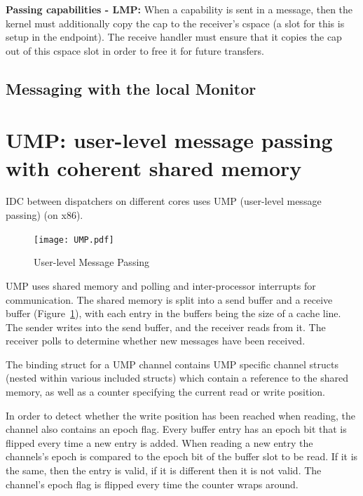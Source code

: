 \documentclass[a4paper,twoside]{report} %
\begin{document}
\textbf{Passing capabilities - LMP:} When a capability is sent in a message, then
the kernel must additionally copy the cap to the receiver's cspace (a slot for
this is setup in the endpoint). The receive handler must ensure that it copies
the cap out of this cspace slot in order to free it for future transfers.



\subsection{Messaging with the local Monitor}
\label{sec:monitor}


\section{UMP: user-level message passing with coherent shared memory}
\label{sec:ump_icd}

IDC between dispatchers on different cores uses UMP (user-level message passing)
(on x86).

\begin{figure}
  \begin{center}
    \texttt{[image: UMP.pdf]}
  \end{center}
  \caption{User-level Message Passing}
  \label{fig:ump}
\end{figure}

UMP uses shared memory and polling and inter-processor interrupts for
communication. The shared memory is split into a send buffer and a receive
buffer (Figure~\ref{fig:ump}), with each entry in the buffers being the size of
a cache line. The sender writes into the send buffer, and the receiver reads
from it. The receiver polls to determine whether new messages have been
received.

The binding struct for a UMP channel contains UMP specific channel structs
(nested within various included structs) which contain a reference to the shared
memory, as well as a counter specifying the current read or write position.

In order to detect whether the write position has been reached when reading, the
channel also contains an epoch flag. Every buffer entry has an epoch bit that is
flipped every time a new entry is added. When reading a new entry the channels's
epoch is compared to the epoch bit of the buffer slot to be read. If it is the
same, then the entry is valid, if it is different then it is not valid. The
channel's epoch flag is flipped every time the counter wraps around.
\end{document}

